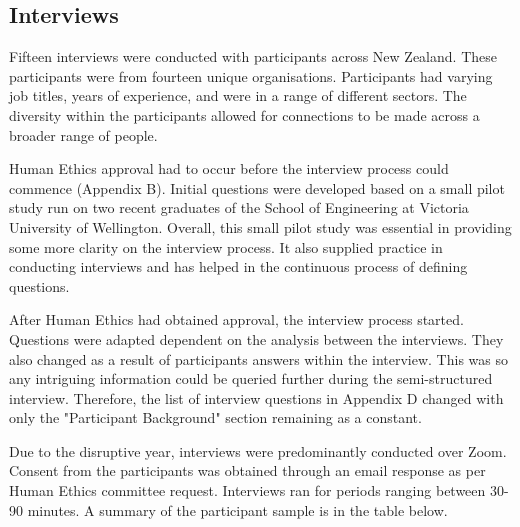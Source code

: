 \subsection{Interviews}

\par Fifteen interviews were conducted with participants across New Zealand. These participants were from fourteen unique organisations. Participants had varying job titles, years of experience, and were in a range of different sectors. The diversity within the participants allowed for connections to be made across a broader range of people. 
\newline
\par Human Ethics approval had to occur before the interview process could commence (Appendix B). Initial questions were developed based on a small pilot study run on two recent graduates of the School of Engineering at Victoria University of Wellington. Overall, this small pilot study was essential in providing some more clarity on the interview process. It also supplied practice in conducting interviews and has helped in the continuous process of defining questions.
\newline
\par After Human Ethics had obtained approval, the interview process started. Questions were adapted dependent on the analysis between the interviews. They also changed as a result of participants answers within the interview. This was so any intriguing information could be queried further during the semi-structured interview. Therefore, the list of interview questions in Appendix D changed with only the "Participant Background" section remaining as a constant.
\newline
\par Due to the disruptive year, interviews were predominantly conducted over Zoom. Consent from the participants was obtained through an email response as per Human Ethics committee request. Interviews ran for periods ranging between 30-90 minutes. A summary of the participant sample is in the table below. 
\newline
\newline


